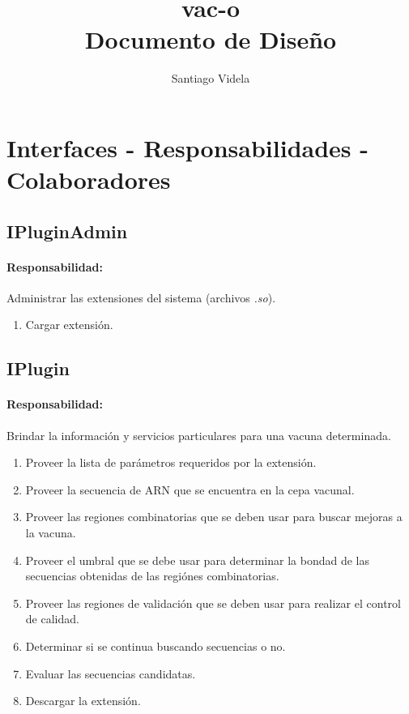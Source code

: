 \documentclass[a4paper,10pt]{article}
\author{Santiago Videla}
\title{vac-o\\ Documento de Dise\~no}
\begin{document}
\maketitle
\newpage
\tableofcontents
\newpage

\section{Interfaces - Responsabilidades - Colaboradores} 
  \subsection{IPluginAdmin}
    \paragraph{Responsabilidad:} Administrar las extensiones del sistema
(archivos \textit{.so}).    
      \begin{enumerate}
       \item Cargar extensi\'on.       
      \end{enumerate}    

  \subsection{IPlugin}
    \paragraph{Responsabilidad:} Brindar la informaci\'on y servicios
particulares para una vacuna determinada.    
      \begin{enumerate}
       \item Proveer la lista de par\'ametros requeridos por la extensi\'on.
       \item Proveer la secuencia de ARN que se encuentra en la cepa vacunal.
       \item Proveer las regiones combinatorias que se deben usar para buscar
mejoras a la vacuna.
       \item Proveer el umbral que se debe usar para determinar la bondad de las
secuencias obtenidas de las regi\'ones combinatorias.
       \item Proveer las regiones de validaci\'on que se deben usar para
realizar el control de calidad.
       \item Determinar si se continua buscando secuencias o no.
       \item Evaluar las secuencias candidatas.
       \item Descargar la extensi\'on.
      \end{enumerate}
\end{document}
